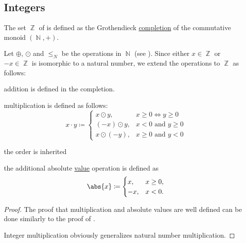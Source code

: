 \subsection{Integers}\label{subsec:integers}

\begin{definition}\label{def:integers}
  The set \( \BbbZ \) of  is defined as the Grothendieck \hyperref[thm:monoid_completion_to_abelian_group]{completion} of the commutative monoid \( (\BbbN, +) \).

  Let \( \oplus \), \( \odot \) and \( \leq_N \) be the operations in \( \BbbN \) (see ). Since either \( x \in \BbbZ \) or \( -x \in \BbbZ \) is isomorphic to a natural number, we extend the operations to \( \BbbZ \) as follows:
  \begin{thmenum}
    \item addition is defined in the completion.
    \item multiplication is defined as follows:
          \begin{equation*}
            x \cdot y \coloneqq \begin{cases}
              x \odot y,    & x \geq 0 \iff y \geq 0      \\
              (-x) \odot y, & x < 0 \text{ and } y \geq 0 \\
              x \odot (-y), & x \geq 0 \text{ and } y < 0
            \end{cases}
          \end{equation*}

     the order is inherited
    \item the additional absolute \hyperref[def:absolute_value]{value} operation is defined as
          \begin{equation*}
            \abs{x} \coloneqq \begin{cases}
              x,  & x \geq 0, \\
              -x, & x < 0.
            \end{cases}
          \end{equation*}
  \end{thmenum}
\end{definition}
\begin{proof}
  The proof that multiplication and absolute values are well defined can be done similarly to the proof of .

  Integer multiplication obviously generalizes natural number multiplication.
\end{proof}

